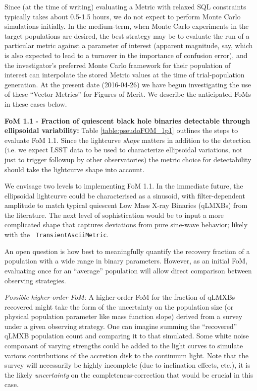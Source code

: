 Since (at the time of writing) evaluating a Metric with relaxed
  SQL constraints typically takes about 0.5-1.5 hours, we do not
  expect to perform Monte Carlo simulations initially. In the
  medium-term, when Monte Carlo experiments in the target populations
  are desired, the best strategy may be to evaluate the
  run of a particular metric against a parameter of interest (apparent
  magnitude, say, which is also expected to lead to a turnover in the
  importance of confusion error), and the investigator's preferred
  Monte Carlo framework for their population of interest can
  interpolate the stored Metric values at the time of trial-population
  generation. At the present date (2016-04-26) we have begun
  investigating the use of these ``Vector Metrics'' for Figures of
  Merit. We describe the anticipated FoMs in these cases below.

{\bf FoM 1.1 - Fraction of quiescent black hole binaries detectable
  through ellipsoidal variability:} Table
  \ref{table:pseudoFOM_1p1} outlines the steps to evaluate FoM
  1.1. Since the lightcurve {\it shape} matters in addition to the
  detection (i.e. we expect LSST data to be used to characterize
  ellipsoidal variations, not just to trigger followup by other
  observatories) the metric choice for detectability should take the
  lightcurve shape into account.

  We envisage two levels to implementing FoM 1.1. In the immediate
  future, the ellipsoidal lightcurve could be characterised as a
  sinusoid, with filter-dependent amplitude to match typical quiescent
  Low Mass X-ray Binaries (qLMXBs) from the literature. The next level
  of sophistication would be to input a more complicated shape that
  captures deviations from pure sine-wave behavior; likely with the {\tt
    TransientAsciiMetric}.

An open question is how best to meaningfully quantify the
  recovery fraction of a population with a wide range in binary
  parameters. However, as an initial FoM, evaluating once for an
  ``average'' population will allow direct comparison between
  observing strategies.

{\it Possible higher-order FoM:} A higher-order FoM for the fraction
of qLMXBs recovered might take the form of the uncertainty on the
population size (or physical population parameter like mass function
slope) derived from a survey under a given observing strategy. One can
imagine summing the ``recovered'' qLMXB population count and comparing
it to that simulated. Some white noise componant of varying strengths
could be added to the light curves to simulate various contributions
of the accretion disk to the continuum light.  Note that the survey
will necessarily be highly incomplete (due to inclination effects,
etc.), it is the likely {\it uncertainty} on the
completeness-correction that would be crucial in this case.

